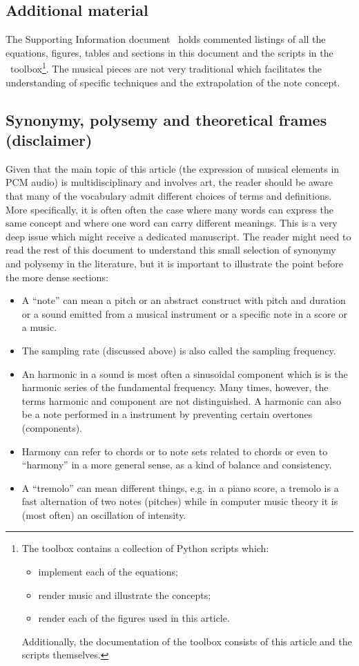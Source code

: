 \subsection{Additional material}
The Supporting Information document~\cite{SI} holds commented listings of all the equations, figures, tables and sections in this document
and the scripts in the \massa\ toolbox\footnote{The toolbox contains a collection of Python scripts which:
\begin{itemize}
    \item implement each of the equations;
    \item render music and illustrate the concepts;
    \item render each of the figures used in this article.
\end{itemize}
Additionally, the documentation of the toolbox consists of this article and the scripts themselves.}.
The musical pieces are not very traditional which facilitates the understanding of specific techniques
and the extrapolation of the note concept.

\subsection{Synonymy, polysemy and theoretical frames (disclaimer)}
Given that the main topic of this article (the expression of musical elements
in PCM audio) is multidisciplinary and involves art,
the reader should be aware that many of the vocabulary admit different choices of terms and definitions.
More specifically, it is often often the case where many words can express the same concept
and where one word can carry different meanings.
This is a very deep issue which might receive a dedicated manuscript.
The reader might need to read the rest of this document to understand this
small selection of synonymy and polysemy in the literature,
but it is important to illustrate the point before the more dense sections:
\begin{itemize}
	\item A ``note'' can mean a pitch or an abstract construct with pitch and duration or a sound emitted from a musical instrument or a specific note in a score or a music.
	\item The sampling rate (discussed above) is also called the sampling frequency.
	\item An harmonic in a sound is most often a sinusoidal component which is is the harmonic series of the fundamental frequency. Many times, however, the terms harmonic and component are not distinguished. A harmonic can also be a note performed in a instrument by preventing certain overtones (components).
	\item Harmony can refer to chords or to note sets related to chords or even to ``harmony'' in a more general sense, as a kind of balance and consistency.
	\item A ``tremolo'' can mean different things, e.g. in a piano score, a tremolo is a fast alternation of two notes (pitches) while in computer music theory it is (most often) an oscillation of intensity.
\end{itemize}

